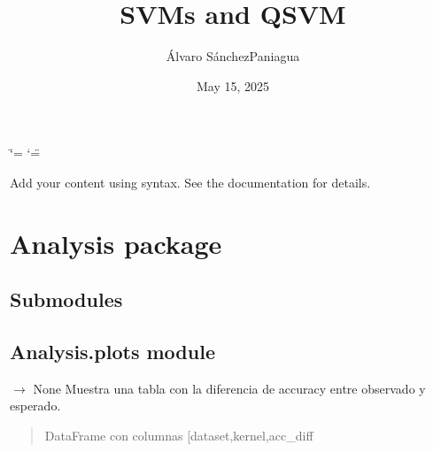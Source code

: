 \documentclass[letterpaper,10pt,english]{sphinxmanual}
\title{SVMs and QSVM}
\date{May 15, 2025}
\author{Álvaro Sánchez\sphinxhyphen{}Paniagua}
\begin{document}
\ifdefined\shorthandoff
  \ifnum\catcode`\=\string=\active\shorthandoff{=}\fi
  \ifnum\catcode`\"=\active{}\fi
\fi

\pagestyle{empty}
\sphinxmaketitle
\pagestyle{plain}
\sphinxtableofcontents
\pagestyle{normal}
\label{\detokenize{index::doc}}


\sphinxAtStartPar
Add your content using  syntax. See the
documentation for details.

\sphinxstepscope


\chapter{Analysis package}
\label{\detokenize{Analysis:analysis-package}}\label{\detokenize{Analysis::doc}}

\section{Submodules}
\label{\detokenize{Analysis:submodules}}

\section{Analysis.plots module}
\label{\detokenize{Analysis:module-Analysis.plots}}\label{\detokenize{Analysis:analysis-plots-module}}

\begin{fulllineitems}
\label{\detokenize{Analysis:Analysis.plots.plot_accuracy_diff_table}}
\pysigstartsignatures
\pysiglinewithargsret
{}
{\sphinxparamcomma {}}
{{ $\rightarrow$ None}}
\pysigstopsignatures
\sphinxAtStartPar
Muestra una tabla con la diferencia de accuracy entre observado y esperado.
\begin{quote}\begin{description}
\sphinxAtStartPar
{} \sphinxhyphen{}\sphinxhyphen{} DataFrame con columnas {[}\textquotesingle{}dataset\textquotesingle{},\textquotesingle{}kernel\textquotesingle{},\textquotesingle{}acc\_diff\textquotesingle{}{]}

\end{description}\end{quote}

\end{fulllineitems}
\end{document}
